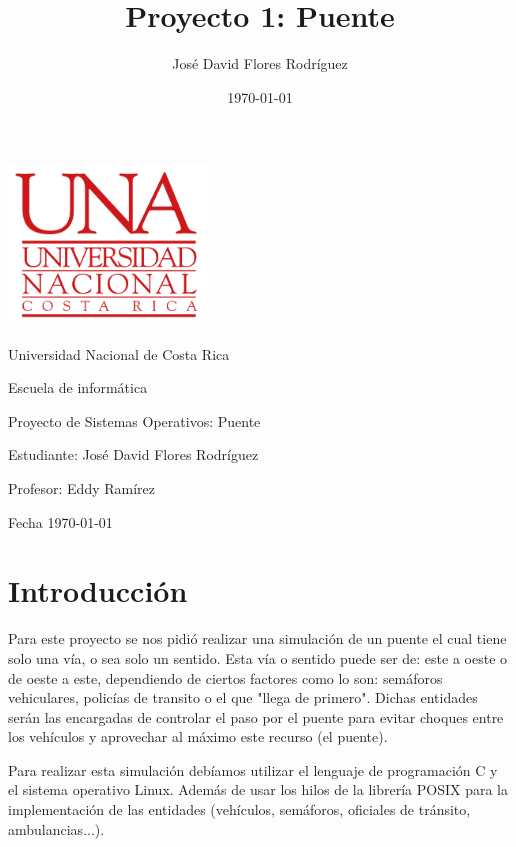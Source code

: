 \documentclass[16pt,a4papper]{article}
\title{Proyecto 1: Puente}
\author{José David Flores Rodríguez}
\date{\today}
\begin{document}
	\begin{center}
		
		\includegraphics[width=200px]{Logo-UNA.png}
		\vspace{1cm}

	
		\LARGE
		Universidad Nacional de Costa Rica
		\vspace{1cm}
		
	
		\LARGE
		Escuela de informática
		\vspace{1cm}
		

		\LARGE
		Proyecto de Sistemas Operativos: Puente
		\vspace{1cm}
		

		\LARGE
		Estudiante: José David Flores Rodríguez
		\vspace{1cm}
		
	
		\LARGE
		Profesor: Eddy Ramírez
		\vspace{1cm}
	
		\LARGE
		Fecha \today
		\vspace{1cm}
	\end{center}
	
	\newpage
	\section{Introducción}
	Para este proyecto se nos pidió realizar una simulación de un puente el cual tiene solo una vía, o sea solo un sentido. Esta vía o sentido puede ser de: este a oeste o de oeste a este, dependiendo de ciertos factores como lo son: semáforos vehiculares, policías de transito o el que "llega de primero". Dichas entidades serán las encargadas de controlar el paso por el puente para evitar choques entre los vehículos y aprovechar al máximo este recurso (el puente).\par
	
	Para realizar esta simulación debíamos utilizar el lenguaje de programación C y el sistema operativo Linux. Además de usar los hilos de la librería POSIX para la implementación de las entidades (vehículos, semáforos, oficiales de tránsito, ambulancias...).\par
\end{document}
